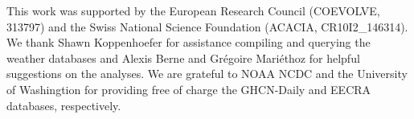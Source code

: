 \begin{refsection}
\begin{subappendices}


\begin{subacknowledgements}
	This work was supported by the European Research Council (COEVOLVE, 313797) and the Swiss National Science Foundation (ACACIA, CR10I2\_146314). We thank Shawn Koppenhoefer for assistance compiling and querying the weather databases and Alexis Berne and Grégoire Mariéthoz for helpful suggestions on the analyses. We are grateful to NOAA NCDC and the University of Washingtion for providing free of charge the GHCN-Daily and EECRA databases, respectively.
\end{subacknowledgements}

\end{subappendices}

\printbibliography[heading=subbibintoc]

\end{refsection}
